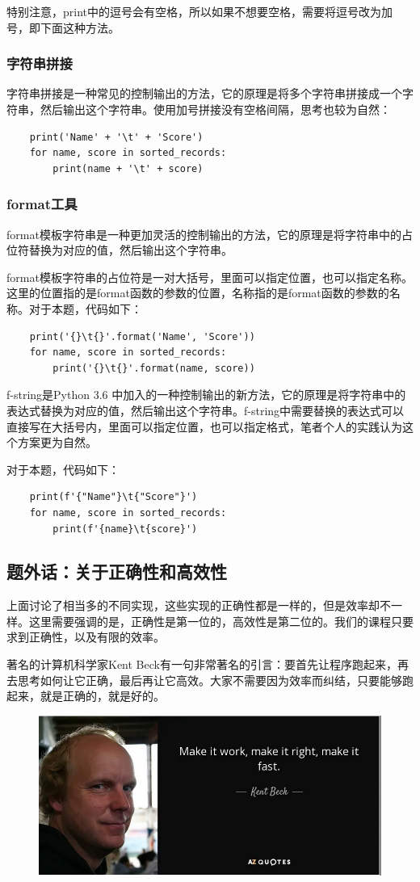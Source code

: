 \documentclass{article}
\begin{document}
特别注意，print中的逗号会有空格，所以如果不想要空格，需要将逗号改为加号，即下面这种方法。

\subsubsection{字符串拼接}

字符串拼接是一种常见的控制输出的方法，它的原理是将多个字符串拼接成一个字符串，然后输出这个字符串。使用加号拼接没有空格间隔，思考也较为自然：
\begin{lstlisting}
    print('Name' + '\t' + 'Score')
    for name, score in sorted_records:
        print(name + '\t' + score)
\end{lstlisting}

\subsubsection{format工具}

format模板字符串是一种更加灵活的控制输出的方法，它的原理是将字符串中的占位符替换为对应的值，然后输出这个字符串。

format模板字符串的占位符是一对大括号，里面可以指定位置，也可以指定名称。这里的位置指的是format函数的参数的位置，名称指的是format函数的参数的名称。对于本题，代码如下：

\begin{lstlisting}
    print('{}\t{}'.format('Name', 'Score'))
    for name, score in sorted_records:
        print('{}\t{}'.format(name, score))
\end{lstlisting}

f-string是Python 3.6 中加入的一种控制输出的新方法，它的原理是将字符串中的表达式替换为对应的值，然后输出这个字符串。f-string中需要替换的表达式可以直接写在大括号内，里面可以指定位置，也可以指定格式，笔者个人的实践认为这个方案更为自然。

对于本题，代码如下：
\begin{lstlisting}
    print(f'{"Name"}\t{"Score"}')
    for name, score in sorted_records:
        print(f'{name}\t{score}')
\end{lstlisting}

\subsection*{题外话：关于正确性和高效性}

上面讨论了相当多的不同实现，这些实现的正确性都是一样的，但是效率却不一样。这里需要强调的是，正确性是第一位的，高效性是第二位的。我们的课程只要求到正确性，以及有限的效率。

著名的计算机科学家Kent Beck有一句非常著名的引言：要首先让程序跑起来，再去思考如何让它正确，最后再让它高效。大家不需要因为效率而纠结，只要能够跑起来，就是正确的，就是好的。

\begin{figure}[htbp]
    \centering
    \includegraphics[width=.9\linewidth]{quote.png}
\end{figure}
\end{document}
